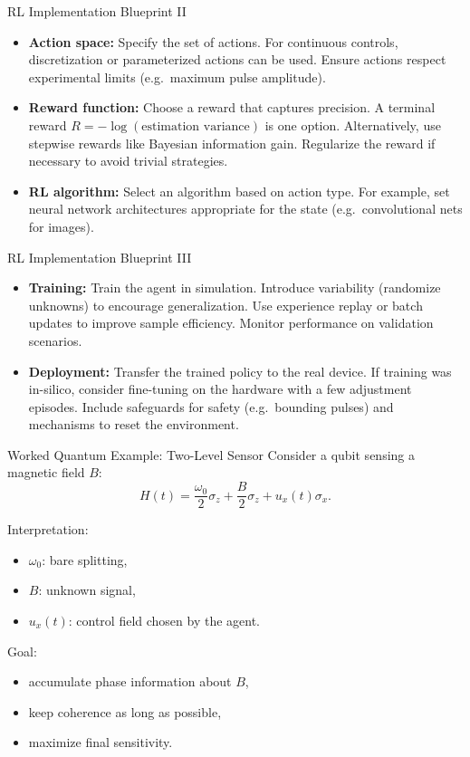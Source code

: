 \documentclass[aspectratio=169]{beamer}
\begin{document}
\begin{frame}{RL Implementation Blueprint II}
\begin{itemize}
  \item {\bf Action space:} Specify the set of actions.  For continuous controls, discretization or parameterized actions can be used.  Ensure actions respect experimental limits (e.g.\ maximum pulse amplitude). 
  \item {\bf Reward function:} Choose a reward that captures precision.  A terminal reward $R = -\log(\text{estimation variance})$ is one option.  Alternatively, use stepwise rewards like Bayesian information gain.  Regularize the reward if necessary to avoid trivial strategies.
  \item {\bf RL algorithm:} Select an algorithm based on action type.  For example,  set neural network architectures appropriate for the state (e.g.\ convolutional nets for images).
\end{itemize}
\end{frame}

\begin{frame}{RL Implementation Blueprint III}
\begin{itemize}
  \item {\bf Training:} Train the agent in simulation.  Introduce variability (randomize unknowns) to encourage generalization.  Use experience replay or batch updates to improve sample efficiency.  Monitor performance on validation scenarios.
  \item {\bf Deployment:} Transfer the trained policy to the real device.  If training was in-silico, consider fine-tuning on the hardware with a few adjustment episodes.  Include safeguards for safety (e.g.\ bounding pulses) and mechanisms to reset the environment.
\end{itemize}
\end{frame}




\begin{frame}{Worked Quantum Example: Two-Level Sensor}
  Consider a qubit sensing a magnetic field $B$:
  \[
  H(t)=\frac{\omega_0}{2}\sigma_z + \frac{B}{2}\sigma_z + u_x(t)\sigma_x.
  \]

  Interpretation:
  \begin{itemize}
  \item $\omega_0$: bare splitting,
  \item $B$: unknown signal,
  \item $u_x(t)$: control field chosen by the agent.
  \end{itemize}

  Goal:
  \begin{itemize}
  \item accumulate phase information about $B$,
  \item keep coherence as long as possible,
  \item maximize final sensitivity.
  \end{itemize}
\end{frame}
\end{document}
